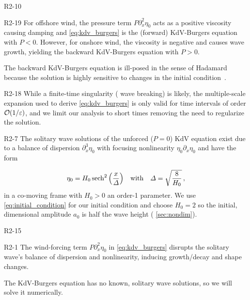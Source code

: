 \documentclass{jfm}
\renewcommand*{\epsilon}{\varepsilon}
\begin{document}
\begin{LineLabel}{R2-10}
\begin{LineLabel}{R2-19}
For offshore wind, the pressure term $P \partial^2_x \eta_0$ acts as a
positive viscosity causing damping and \cref{eq:kdv_burgers} is the
(forward) KdV-Burgers equation with $P<0$.
However, for onshore wind, the viscosity is negative and causes wave
growth, yielding the backward KdV-Burgers equation with $P>0$.
\end{LineLabel}
The backward KdV-Burgers equation is ill-posed in the sense of Hadamard
because the solution is highly sensitive to changes in the initial
condition~\citep{hadamard1902problemes}.
\begin{LineLabel}{R2-18}
While a finite-time singularity (\ie{} wave breaking) is likely, the
multiple-scale expansion used to derive \cref{eq:kdv_burgers} is only
valid for time intervals of order $\order{1/\epsilon}$, and we limit our
analysis to short times removing the need to regularize the solution.
\end{LineLabel}
\end{LineLabel}

\begin{LineLabel}{R2-7}
The solitary wave solutions of the unforced ($P=0$) KdV equation exist
due to a balance of dispersion $\partial_x^3 \eta_0$ with focusing
nonlinearity $\eta_0 \partial_x \eta_0$ and have the
form~\citep[\eg][]{mei2005nonlinear}
\end{LineLabel}
\begin{equation}
  \eta_0 = H_0 \sech^2\pqty{\frac{x}{\Delta}}
  \qq{with}
  \Delta = \sqrt{\frac{8}{H_0}} \,,
  \label{eq:initial_condition}
\end{equation}
in a co-moving frame with $H_0>0$ an order-1 parameter.
We use \cref{eq:initial_condition} for our initial condition and choose
$H_0 = 2$ so the initial, dimensional amplitude $a_0$ is half the wave
height (\cf{} \cref{sec:nondim}).
\begin{LineLabel}{R2-15}
\begin{LineLabel}{R2-1}
The wind-forcing term $P \partial_x^2 \eta_0$ in \cref{eq:kdv_burgers}
disrupts the solitary wave's balance of dispersion and nonlinearity,
inducing growth/decay and shape changes.
\end{LineLabel}
\end{LineLabel}
The KdV-Burgers equation has no known, solitary wave solutions, so we
will solve it numerically.
\end{document}
